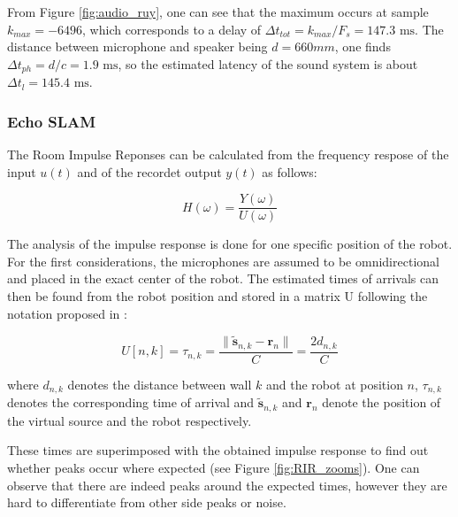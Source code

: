 From Figure \ref{fig:audio_ruy}, one can see that the maximum occurs at sample $k_{max}=-6496$, which corresponds to a delay of $\Delta t_{tot}=k_{max}/F_s=147.3 \text{ ms}$. The distance between microphone and speaker being $d=660mm$, one finds $\Delta t_{ph} = d/c=1.9  \text{ ms}$, so the estimated latency of the sound system is about $\Delta t_{l}=145.4 \text{ ms}$.

\subsubsection{Echo SLAM}

The Room Impulse Reponses can be calculated from the frequency respose of the input $u(t)$ and of the recordet output $y(t)$ as follows:

\begin{equation}
    H(\omega) = \frac{Y(\omega)}{U(\omega)}
    \label{eq:impulse}
\end{equation}

The analysis of the impulse response is done for one specific position of the robot. For the first considerations, the microphones are assumed to be omnidirectional and placed in the exact center of the robot. 
The estimated times of arrivals can then be found from the robot position and stored in a matrix U following the notation proposed in \cite{Miranda}:

\begin{equation}
    U[n,k]=\tau_{n,k}=\frac{\| \tilde{\mathbf{s}}_{n,k}-\mathbf{r}_{n} \|}{C}=\frac{2d_{n,k}}{C}
    \label{eq:TOA}
\end{equation}

where $d_{n,k}$ denotes the distance between wall $k$ and the robot at position $n$, $\tau_{n,k}$ denotes the corresponding time of arrival and $\tilde{\mathbf{s}}_{n,k}$ and $\mathbf{r}_{n}$ denote the position of the virtual source and the robot respectively. 

These times are superimposed with the obtained impulse response to find out whether peaks occur where expected (see Figure \ref{fig:RIR_zooms}).
One can observe that there are indeed peaks around the expected times, however they are hard to differentiate from other side peaks or noise.

